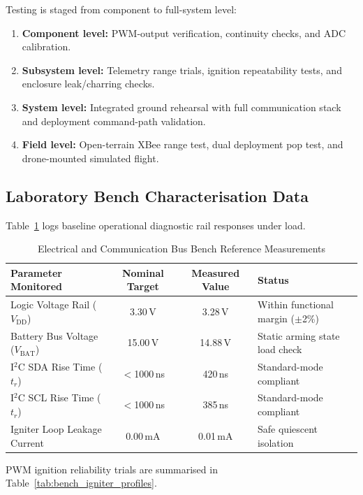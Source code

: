 Testing is staged from component to full-system level:
\begin{enumerate}
  \item \textbf{Component level:} PWM-output verification, continuity checks,
    and ADC calibration.
  \item \textbf{Subsystem level:} Telemetry range trials, ignition repeatability
    tests, and enclosure leak/charring checks.
  \item \textbf{System level:} Integrated ground rehearsal with full communication
    stack and deployment command-path validation.
  \item \textbf{Field level:} Open-terrain XBee range test, dual deployment pop
    test, and drone-mounted simulated flight.
\end{enumerate}

\subsection{Laboratory Bench Characterisation Data}

Table~\ref{tab:bench_bus_measurements} logs baseline operational diagnostic rail
responses under load.

\begin{table}[!htbp]
  \centering
  \caption{Electrical and Communication Bus Bench Reference Measurements}
  \label{tab:bench_bus_measurements}
  \small
  \renewcommand{\arraystretch}{1.2}
  \begin{tabular}{@{}l|c|c|l@{}}
    \toprule
    \rowcolor{gray!22}\textbf{Parameter Monitored} & \textbf{Nominal Target} & \textbf{Measured Value} & \textbf{Status} \\ \midrule
    Logic Voltage Rail ($V_\mathrm{DD}$) & 3.30\,V & 3.28\,V & Within functional margin ($\pm$2\%) \\ \hline
    Battery Bus Voltage ($V_\mathrm{BAT}$) & 15.00\,V & 14.88\,V & Static arming state load check \\ \hline
    I$^2$C SDA Rise Time ($t_r$) & $<$1000\,ns & 420\,ns & Standard-mode compliant \\ \hline
    I$^2$C SCL Rise Time ($t_r$) & $<$1000\,ns & 385\,ns & Standard-mode compliant \\ \hline
    Igniter Loop Leakage Current & 0.00\,mA & 0.01\,mA & Safe quiescent isolation \\ \bottomrule
  \end{tabular}
\end{table}

PWM ignition reliability trials are summarised in Table~\ref{tab:bench_igniter_profiles}.

